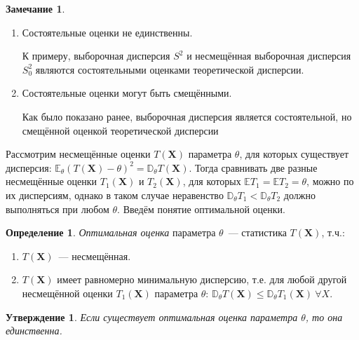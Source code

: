 \documentclass[oneside,final,14pt]{extreport}
\theoremstyle{plain}
\newtheorem*{thm*}{Утверждение}
\theoremstyle{definition}
\newtheorem*{defn}{Определение}
\newtheorem*{rmrk}{Замечание}
\theoremstyle{named}
\begin{document}
\begin{rmrk}
\begin{enumerate}
    \item Состоятельные оценки не единственны.
    
    К примеру, выборочная дисперсия $S^{2}$ и несмещённая выборочная дисперсия $S_0^{2}$ являются состоятельными оценками теоретической дисперсии.
    
    \item Состоятельные оценки могут быть смещёнными.
    
    Как было показано ранее, выборочная дисперсия является состоятельной, но смещённой оценкой теоретической дисперсии
    
    \end{enumerate}
\end{rmrk}

Рассмотрим несмещённые оценки $T(\mathbf{X})$ параметра $\theta$, для которых существует дисперсия: $\mathbb{E}_{\theta}(T(\mathbf{X})-\theta)^{2}=\mathbb{D}_{\theta} T(\mathbf{X})$. Тогда сравнивать две разные несмещённые оценки $T_{1}(\mathbf{X})$ и $T_{2}(\mathbf{X})$, для которых $\mathbb{E}T_{1} = \mathbb{E}T_{2} = \theta$, можно по их дисперсиям, однако в таком случае неравенство $\mathbb{D}_{\theta} T_{1}<\mathbb{D}_{\theta} T_{2}$ должно выполняться при любом $\theta$. Введём понятие оптимальной оценки.
\pagebreak
\begin{defn}
{\it Оптимальная оценка} параметра $\theta$~--- статистика $T(\mathbf{X})$, т.ч.:
\begin{enumerate}
    \item $T(\mathbf{X})$~--- несмещённая.
    \item $T(\mathbf{X})$ имеет равномерно минимальную дисперсию, т.е. для любой другой несмещённой оценки $T_{1}(\mathbf{X})$ параметра $\theta$: $\mathbb{D}_{\theta} T(\mathbf{X}) \leqslant \mathbb{D}_{\theta} T_{1}(\mathbf{X})~ \forall X$.
\end{enumerate}
\end{defn}

\begin{thm*}
Если существует оптимальная оценка параметра $\theta$, то она единственна.
\end{thm*}
\end{document}

